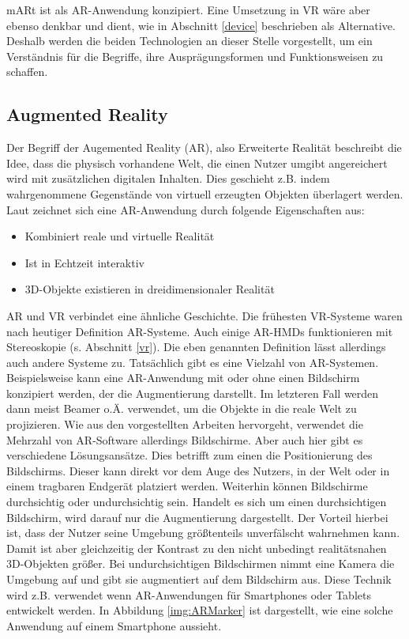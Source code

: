 mARt ist als AR-Anwendung konzipiert. Eine Umsetzung in VR wäre aber ebenso denkbar und dient, wie in Abschnitt \ref{device} beschrieben als Alternative.
Deshalb werden die beiden Technologien an dieser Stelle vorgestellt, um ein Verständnis für die Begriffe, ihre Ausprägungsformen und Funktionsweisen zu schaffen.

\subsection{Augmented Reality}

Der Begriff der Augemented Reality (AR), also Erweiterte Realität beschreibt die Idee, dass die physisch vorhandene Welt, die einen Nutzer umgibt angereichert wird mit zusätzlichen digitalen Inhalten. Dies geschieht z.B. indem wahrgenommene Gegenstände von virtuell erzeugten Objekten überlagert werden. 
Laut \cite{azuma97} zeichnet sich eine AR-Anwendung durch folgende Eigenschaften aus:

\begin{itemize}
\item Kombiniert reale und virtuelle Realität
\item Ist in Echtzeit interaktiv
\item 3D-Objekte existieren in dreidimensionaler Realität
\end{itemize}

AR und VR verbindet eine ähnliche Geschichte. Die frühesten VR-Systeme waren nach heutiger Definition AR-Systeme.
Auch einige AR-HMDs funktionieren mit Stereoskopie (s. Abschnitt \ref{vr}). Die eben genannten Definition lässt allerdings auch andere Systeme zu. Tatsächlich gibt es eine Vielzahl von AR-Systemen. 
Beispielsweise kann eine AR-Anwendung mit oder ohne einen Bildschirm konzipiert werden, der die Augmentierung darstellt. Im letzteren Fall werden dann meist Beamer o.Ä. verwendet, um die Objekte in die reale Welt zu projizieren. 
Wie aus den vorgestellten Arbeiten hervorgeht, verwendet die Mehrzahl von AR-Software allerdings Bildschirme. 
Aber auch hier gibt es verschiedene Lösungsansätze. Dies betrifft zum einen die Positionierung des Bildschirms. Dieser kann direkt vor dem Auge des Nutzers, in der Welt oder in einem tragbaren Endgerät platziert werden.
Weiterhin können Bildschirme durchsichtig oder undurchsichtig sein. Handelt es sich um einen durchsichtigen Bildschirm, wird darauf nur die Augmentierung dargestellt. Der Vorteil hierbei ist, dass der Nutzer seine Umgebung größtenteils unverfälscht wahrnehmen kann. Damit ist aber gleichzeitig der Kontrast zu den nicht unbedingt realitätsnahen 3D-Objekten größer.
Bei undurchsichtigen Bildschirmen nimmt eine Kamera die Umgebung auf und gibt sie augmentiert auf dem Bildschirm aus. Diese Technik wird z.B. verwendet wenn AR-Anwendungen für Smartphones oder Tablets entwickelt werden. In Abbildung \ref{img:ARMarker} ist dargestellt, wie eine solche Anwendung auf einem Smartphone aussieht.

